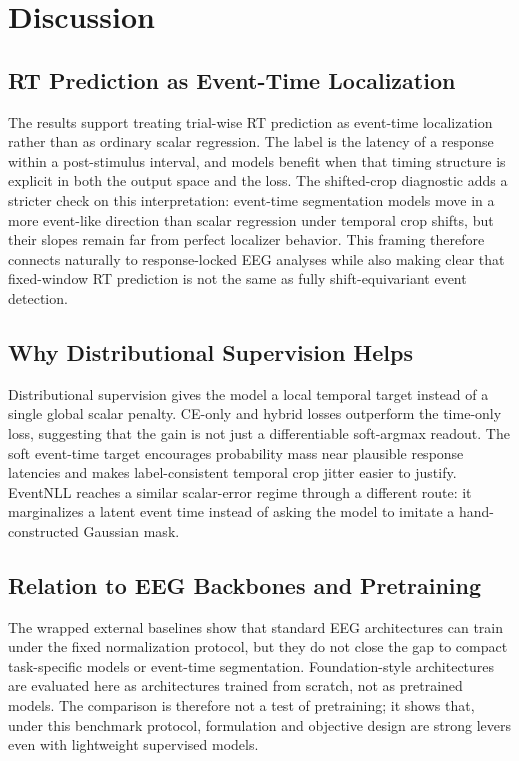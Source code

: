 \documentclass[12pt]{article}
\begin{document}
\section{Discussion}

\subsection{RT Prediction as Event-Time Localization}

The results support treating trial-wise RT prediction as event-time localization rather than as ordinary scalar regression. The label is the latency of a response within a post-stimulus interval, and models benefit when that timing structure is explicit in both the output space and the loss. The shifted-crop diagnostic adds a stricter check on this interpretation: event-time segmentation models move in a more event-like direction than scalar regression under temporal crop shifts, but their slopes remain far from perfect localizer behavior. This framing therefore connects naturally to response-locked EEG analyses while also making clear that fixed-window RT prediction is not the same as fully shift-equivariant event detection.

\subsection{Why Distributional Supervision Helps}

Distributional supervision gives the model a local temporal target instead of a single global scalar penalty. CE-only and hybrid losses outperform the time-only loss, suggesting that the gain is not just a differentiable soft-argmax readout. The soft event-time target encourages probability mass near plausible response latencies and makes label-consistent temporal crop jitter easier to justify. EventNLL reaches a similar scalar-error regime through a different route: it marginalizes a latent event time instead of asking the model to imitate a hand-constructed Gaussian mask.

\subsection{Relation to EEG Backbones and Pretraining}

The wrapped external baselines show that standard EEG architectures can train under the fixed normalization protocol, but they do not close the gap to compact task-specific models or event-time segmentation. Foundation-style architectures are evaluated here as architectures trained from scratch, not as pretrained models. The comparison is therefore not a test of pretraining; it shows that, under this benchmark protocol, formulation and objective design are strong levers even with lightweight supervised models.
\end{document}
